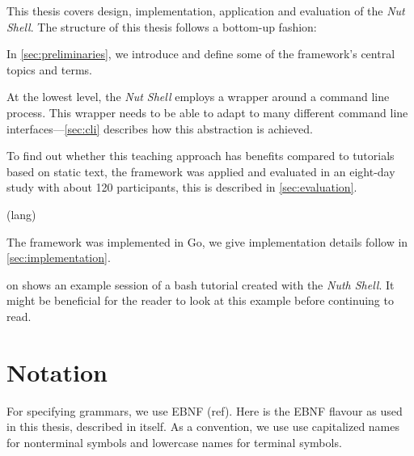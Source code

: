 \documentclass[paper=a4,twoside,abstract=on,cleardoublepage=empty,numbers=noenddot,toc=bib,12pt,appendixprefix=true]{scrreprt}
\begin{document}


This thesis covers design, implementation, application and evaluation of the \emph{Nut Shell}. The structure of this thesis follows a bottom-up fashion:

In \cref{sec:preliminaries}, we introduce and define some of the framework's central topics and terms.

At the lowest level, the \emph{Nut Shell} employs a wrapper around a command line process. This wrapper needs to be able to adapt to many different command line interfaces---\cref{sec:cli} describes how this abstraction is achieved.






To find out whether this teaching approach has benefits compared to tutorials based on static text, the framework was applied and evaluated in an eight-day study with about 120 participants, this is described in \cref{sec:evaluation}.

(lang)

The framework was implemented in Go, we give implementation details follow in \cref{sec:implementation}.

 on  shows an example session of a bash tutorial created with the \emph{Nuth Shell}. It might be beneficial for the reader to look at this example before continuing to read.

\section{Notation}
\label{sec:ebnf}

For specifying grammars, we use EBNF (ref). Here is the EBNF flavour as used in this thesis, described in itself.
As a convention, we use use capitalized names for nonterminal symbols and lowercase names for terminal symbols.
\end{document}
